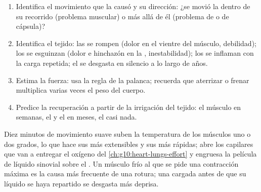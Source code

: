 \begin{method}\label{met:g10:muscles-and-joints:analyse}
\begin{enumerate}
  \item Identifica el movimiento que la causó y su dirección: ¿se movió
        la  dentro de su recorrido (problema muscular) o
        más allá de él (problema de  o de cápsula)?
  \item Identifica el tejido: las  se rompen (dolor en
        el vientre del músculo, debilidad); los  se esguinzan
        (dolor e hinchazón en la , inestabilidad); los
         se inflaman con la carga repetida; el  se
        desgasta en silencio a lo largo de años.
  \item Estima la fuerza: usa la regla de la palanca; recuerda que
        aterrizar o frenar multiplica varias veces el peso del cuerpo.
  \item Predice la recuperación a partir de la irrigación del tejido:
        el músculo en semanas, el  y el  en meses, el
         casi nada.
\end{enumerate}
\end{method}

\begin{remark}\label{rem:g10:muscles-and-joints:warmup}
Diez minutos de movimiento suave suben la temperatura de los músculos
uno o dos grados, lo que hace sus  más extensibles y sus
 más rápidas; abre los capilares que van a entregar el oxígeno
del \cref{ch:g10:heart-lungs-effort} y engruesa la película de líquido
sinovial sobre el . Un músculo frío al que se pide una
contracción máxima es la causa más frecuente de una rotura; una
 cargada antes de que su líquido se haya repartido se
desgasta más deprisa.
\end{remark}

